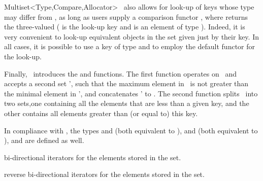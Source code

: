 \begin{ccRefClass}{Multiset<Type,Compare,Allocator>}
\ccRefName\ also allows for look-up of keys whose type may differ from
, as long as users supply a comparison functor ,
where  returns the three-valued
 ( is the look-up key and  is an
element of type ). Indeed, it is very convenient to look-up
equivalent objects in the set given just by their key. In all cases, it is
possible to use a key of type  and to employ the default
 functor for the look-up.

\begin{ccAdvanced}

Finally, \ccRefName\ introduces the  and 
functions. The first function operates on \ccVar\ and accepts a second
set \ccVar', such that the maximum element in \ccVar\ is not greater than
the minimal element in \ccVar', and concatenates \ccVar' to \ccVar. The
second function splits \ccVar\ into two sets,one containing all the
elements that are less than a given key, and the other contains all
elements greater than (or equal to) this key.

\end{ccAdvanced}


\ccTypes




In compliance with \stl, the types  and 
(both equivalent to ),  and 
(both equivalent to ), and  are defined as well.

\ccGlue
{}
{bi-directional iterators for the elements stored in the set.}

\ccGlue
{}
{reverse bi-directional iterators for the elements stored in the set.}


\end{ccRefClass}

